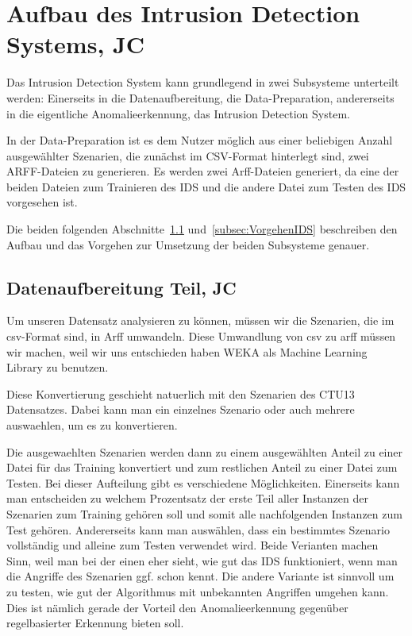 \documentclass[main.tex]{subfiles}
\begin{document}
\section{Aufbau des Intrusion Detection Systems, JC}

Das Intrusion Detection System kann grundlegend in zwei Subsysteme unterteilt werden: Einerseits in die Datenaufbereitung, die Data-Preparation, andererseits in die eigentliche Anomalieerkennung, das Intrusion Detection System.

In der Data-Preparation ist es dem Nutzer möglich aus einer beliebigen Anzahl
ausgewählter Szenarien, die zunächst im CSV-Format hinterlegt sind, zwei
ARFF-Dateien zu generieren. Es werden zwei Arff-Dateien generiert, da eine der
beiden Dateien zum Trainieren des IDS und die andere Datei zum Testen des IDS
vorgesehen ist.

Die beiden folgenden Abschnitte~\ref{subsec:VorgehenDatenaufbereitung}
und~\ref{subsec:VorgehenIDS} beschreiben den Aufbau und das Vorgehen zur
Umsetzung der beiden Subsysteme genauer.

\subsection{Datenaufbereitung Teil, JC} \label{subsec:VorgehenDatenaufbereitung}

Um unseren Datensatz analysieren zu können, müssen wir die Szenarien, die im csv-Format sind, in Arff umwandeln.
Diese Umwandlung von csv zu arff müssen wir machen, weil wir uns entschieden
haben WEKA als Machine Learning Library zu benutzen.

Diese Konvertierung geschieht natuerlich mit den Szenarien des CTU13
Datensatzes.
Dabei kann man ein einzelnes Szenario oder auch mehrere auswaehlen, um es zu
konvertieren.

Die ausgewaehlten Szenarien werden dann zu einem ausgewählten Anteil zu einer Datei
für das Training konvertiert und zum restlichen Anteil zu einer Datei zum Testen.
Bei dieser Aufteilung gibt es verschiedene Möglichkeiten. Einerseits kann man
entscheiden zu welchem Prozentsatz der erste Teil aller Instanzen der
Szenarien zum Training gehören soll und somit alle nachfolgenden Instanzen zum
Test gehören.
Andererseits kann man auswählen, dass ein bestimmtes Szenario vollständig und
alleine zum Testen verwendet wird.
Beide Verianten machen Sinn, weil man bei der einen eher sieht, wie gut das IDS
funktioniert, wenn man die Angriffe des Szenarien ggf. schon kennt.
Die andere Variante ist sinnvoll um zu testen, wie gut der Algorithmus mit
unbekannten Angriffen umgehen kann. Dies ist nämlich gerade der Vorteil den
Anomalieerkennung gegenüber regelbasierter Erkennung bieten soll.
\end{document}

